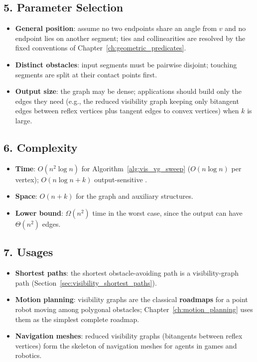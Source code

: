 \subsection{5. Parameter Selection}

\begin{itemize}
\item \textbf{General position}: assume no two endpoints share an angle from
  $v$ and no endpoint lies on another segment; ties and collinearities are
  resolved by the fixed conventions of Chapter~\ref{ch:geometric_predicates}.
\item \textbf{Distinct obstacles}: input segments must be pairwise disjoint;
  touching segments are split at their contact points first.
\item \textbf{Output size}: the graph may be dense; applications should
  build only the edges they need (e.g., the reduced visibility graph keeping
  only bitangent edges between reflex vertices plus tangent edges to convex
  vertices) when $k$ is large.
\end{itemize}

\subsection{6. Complexity}

\begin{itemize}
\item \textbf{Time}: $O(n^2 \log n)$ for Algorithm~\ref{alg:vis_vg_sweep}
  ($O(n \log n)$ per vertex); $O(n \log n + k)$ output-sensitive
  \cite{ghoshmount1991,overmarswelzl1992}.
\item \textbf{Space}: $O(n + k)$ for the graph and auxiliary structures.
\item \textbf{Lower bound}: $\Omega(n^2)$ time in the worst case, since the
  output can have $\Theta(n^2)$ edges.
\end{itemize}

\subsection{7. Usages}

\begin{itemize}
\item \textbf{Shortest paths}: the shortest obstacle-avoiding path is a
  visibility-graph path (Section~\ref{sec:visibility_shortest_paths}).
\item \textbf{Motion planning}: visibility graphs are the classical
  \textbf{roadmaps} for a point robot moving among polygonal
  obstacles; Chapter~\ref{ch:motion_planning} uses them as the simplest
  complete roadmap.
\item \textbf{Navigation meshes}: reduced visibility graphs (bitangents
  between reflex vertices) form the skeleton of navigation meshes for agents
  in games and robotics.
\end{itemize}

